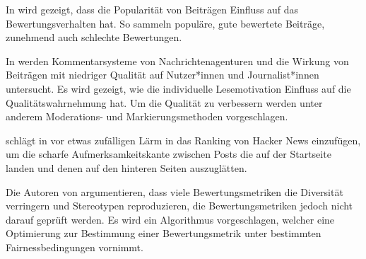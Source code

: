 In \cite{Wu2008334} wird gezeigt, dass die Popularität von Beiträgen Einfluss auf das Bewertungsverhalten hat. So sammeln populäre, gute bewertete Beiträge, zunehmend auch schlechte Bewertungen.

In \cite{Diakopoulos2011133}  werden Kommentarsysteme von Nachrichtenagenturen und die Wirkung von Beiträgen mit niedriger Qualität auf Nutzer*innen und Journalist*innen untersucht. Es wird gezeigt, wie die individuelle Lesemotivation Einfluss auf die Qualitätswahrnehmung hat. Um die Qualität zu verbessern werden unter anderem Moderations- und Markierungsmethoden vorgeschlagen.

\citeauthor{Luu} schlägt in \cite{Luu} vor etwas zufälligen Lärm in das Ranking von Hacker News einzufügen, um die scharfe Aufmerksamkeitskante zwischen Posts die auf der Startseite landen und denen auf  den hinteren Seiten auszuglätten.


Die Autoren von \cite{Celis2018} argumentieren, dass viele Bewertungsmetriken die Diversität verringern und Stereotypen reproduzieren, die Bewertungsmetriken jedoch nicht darauf geprüft werden. Es wird ein Algorithmus vorgeschlagen, welcher eine Optimierung zur Bestimmung einer Bewertungsmetrik unter bestimmten Fairnessbedingungen vornimmt.